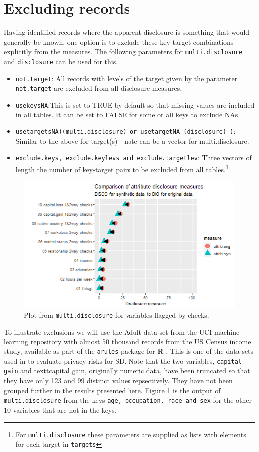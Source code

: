 \documentclass[12pt]{article}
\begin{document}
\section{Excluding records}\label{sec:exclusions}
Having identified records where the apparent disclosure is something that would generally be known, one option is to exclude these key-target combinations explicitly from the measures. The following parameters 
for \texttt{multi.disclosure} and \texttt{disclosure} can be used for this.
\begin{itemize}
\item{\texttt{not.target}: All records with levels of the target given by the parameter \texttt{not.target} are excluded from all disclosure measures.}
\item{\texttt{usekeysNA}:This is set to TRUE by default so that missing values are included in all tables. It can be set to FALSE for some or all keys to exclude NAs.}
\item{\texttt{usetargetsNA)(multi.disclosure) or usetargetNA (disclosure) )}: Similar to the above for target(s) - note can be a vector for multi.disclosure.}
\item{\texttt{exclude.keys, exclude.keylevs and exclude.targetlev}: Three vectors of length the number of key-target pairs to be excluded from all tables.\footnote{For \texttt{multi.disclosure} these parameters are supplied as lists with elements for each target in \texttt{targets}}}
\end{itemize}
\begin{figure}[ht]
\centering
\includegraphics[width=1\linewidth]{fig2dis.png}
\caption{Plot from \texttt{multi.disclosure} for variables flagged by checks.}
\label{fig:f2}
\end{figure}
To illustrate exclusions we will use the Adult data set from the UCI machine learning repository \cite{UCI} with almost 50 thousand records from the US Census income study, available as part of the \texttt{arules} package for \textbf{R} \cite{arules}. This is one of the data sets used in \cite{giomi2022anon} to evaluate privacy risks for SD. Note that the two variables, \texttt{capital gain} and textt{capital gain}, originally numeric data, have been truncated so that they have only 123 and 99 distinct values repsectively. They have not been grouped further in the results presented here.  Figure \ref{fig:f2} is the output of \texttt{multi.disclosure} from the keys \texttt{age, occupation, race and sex} for the other 10 variables that are not in the keys.
\end{document}
